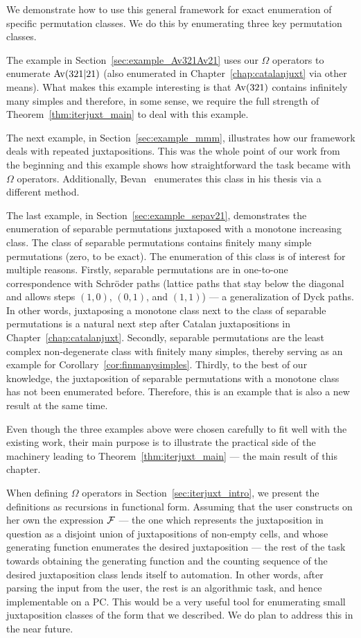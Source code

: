 \documentclass[12pt, a4paper, twoside]{report}
\begin{document}
We demonstrate how to use this general framework for exact enumeration of specific permutation classes. We do this by enumerating three key permutation classes.

The example in Section~\ref{sec:example_Av321Av21} uses our $\Omega$ operators to enumerate $\mathrm{Av}(321|21)$ (also enumerated in Chapter~\ref{chap:catalanjuxt} via other means). What makes this example interesting is that $\mathrm{Av}(321)$ contains infinitely many simples and therefore, in some sense, we require the full strength of Theorem~\ref{thm:iterjuxt_main} to deal with this example.

The next example, in Section~\ref{sec:example_mmm}, illustrates how our framework deals with repeated juxtapositions. This was the whole point of our work from the beginning and this example shows how straightforward the task became with $\Omega$ operators. Additionally, Bevan~\cite{bevan2015thesis} enumerates this class in his thesis via a different method.

The last example, in Section~\ref{sec:example_sepav21}, demonstrates the enumeration of separable permutations juxtaposed with a monotone increasing class. The class of separable permutations contains finitely many simple permutations (zero, to be exact). The enumeration of this class is of interest for multiple reasons. Firstly, separable permutations are in one-to-one correspondence with Schr\"{o}der paths (lattice paths that stay below the diagonal and allows steps $(1,0)$, $(0,1)$, and $(1,1)$) --- a generalization of Dyck paths. In other words, juxtaposing a monotone class next to the class of separable permutations is a natural next step after Catalan juxtapositions in Chapter~\ref{chap:catalanjuxt}. Secondly, separable permutations are the least complex non-degenerate class with finitely many simples, thereby serving as an example for Corollary~\ref{cor:finmanysimples}. Thirdly, to the best of our knowledge, the juxtaposition of separable permutations with a monotone class has not been enumerated before. Therefore, this is an example that is also a new result at the same time.

Even though the three examples above were chosen carefully to fit well with the existing work, their main purpose is to illustrate the practical side of the machinery leading to Theorem~\ref{thm:iterjuxt_main} --- the main result of this chapter.


When defining $\Omega$ operators in Section~\ref{sec:iterjuxt_intro}, we present the definitions as recursions in functional form. Assuming that the user constructs on her own the expression $\mathcal{F}$ --- the one which represents the juxtaposition in question as a disjoint union of juxtapositions of non-empty cells, and whose generating function enumerates the desired juxtaposition --- the rest of the task towards obtaining the generating function and the counting sequence of the desired juxtaposition class lends itself to automation. In other words, after parsing the input from the user, the rest is an algorithmic task, and hence implementable on a PC. This would be a very useful tool for enumerating small juxtaposition classes of the form that we described. We do plan to address this in the near future.
\end{document}

